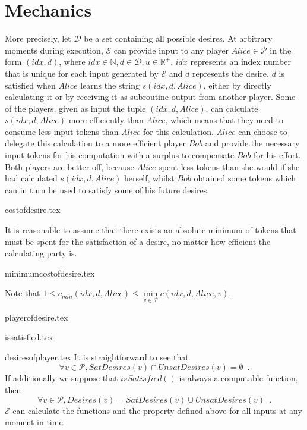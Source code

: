 \section{Mechanics}
  More precisely, let $\mathcal{D}$ be a set containing all possible desires. At arbitrary
  moments during execution, $\mathcal{E}$ can provide input to any player $Alice \in
  \mathcal{P}$ in the form $\left(idx, d\right)$, where $idx \in \mathbb{N}, d \in
  \mathcal{D}, u \in \mathbb{R}^{+}$. $idx$ represents an index number that is unique for
  each input generated by $\mathcal{E}$ and $d$ represents the desire. $d$ is satisfied
  when $Alice$ learns the string $s\left(idx, d, Alice\right)$, either by directly
  calculating it or by receiving it as subroutine output from another player. Some of the
  players, given as input the tuple $\left(idx, d, Alice\right)$, can calculate
  $s\left(idx, d, Alice\right)$ more efficiently than $Alice$, which means that they need
  to consume less input tokens than $Alice$ for this calculation. $Alice$ can choose to
  delegate this calculation to a more efficient player $Bob$ and provide the necessary
  input tokens for his computation with a surplus to compensate $Bob$ for his effort. Both
  players are better off, because $Alice$ spent less tokens than she would if she had
  calculated $s\left(idx, d, Alice\right)$ herself, whilst $Bob$ obtained some tokens
  which can in turn be used to satisfy some of his future desires.

  {costofdesire.tex}

  It is reasonable to assume that there exists an absolute minimum of tokens that must be
  spent for the satisfaction of a desire, no matter how efficient the calculating party
  is.

  {minimumcostofdesire.tex}

  \noindent Note that $1 \leq c_{min}\left(idx, d, Alice\right) \leq \min\limits_{v \in
  \mathcal{P}}{c\left(idx, d, Alice, v\right)}$.

  {playerofdesire.tex}

  {issatisfied.tex}

  {desiresofplayer.tex}
  It is straightforward to see that
  \begin{equation*}
    \forall v \in \mathcal{P}, SatDesires\left(v\right) \cap UnsatDesires\left(v\right) =
    \emptyset \enspace.
  \end{equation*}
  If additionally we suppose that $isSatisfied\left(\right)$ is always a computable
  function, then
  \begin{equation*}
    \forall v \in \mathcal{P}, Desires\left(v\right) = SatDesires\left(v\right) \cup
    UnsatDesires\left(v\right) \enspace.
  \end{equation*}
  $\mathcal{E}$ can calculate the functions and the property defined above for all inputs
  at any moment in time.

